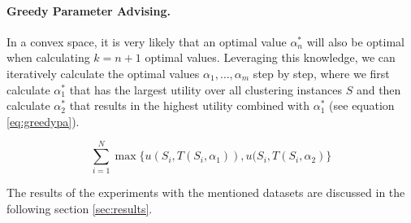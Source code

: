 \paragraph{Greedy Parameter Advising.} In a convex space, it is very likely that an optimal value $\alpha_n^*$ will also be optimal when calculating $k = n + 1$ optimal values. Leveraging this knowledge, we can iteratively calculate the optimal values $\alpha_1, \dots, \alpha_m$ step by step, where we first calculate $\alpha_1^*$ that has the largest utility over all clustering instances $S$ and then calculate $\alpha_2^*$ that results in the highest utility combined with $\alpha_1^*$ (see equation \ref{eq:greedypa}).

\begin{equation}
\sum_{i=1}^N \max\{u(S_i, T(S_i, \alpha_1)), u(S_i, T(S_i, \alpha_2)\} 
\label{eq:greedypa}
\end{equation}

The results of the experiments with the mentioned datasets are discussed in the following section \ref{sec:results}.